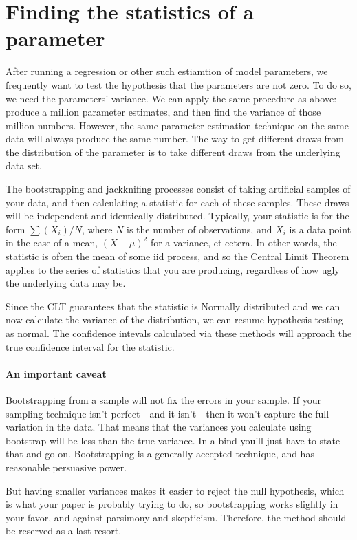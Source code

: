 \section{Finding the statistics of a parameter}
After running a regression or other such estiamtion of model parameters,
we frequently want to test the hypothesis that the parameters are not
zero. To do so, we need the parameters' variance.
We can apply the same procedure as above: produce a million parameter
estimates, and then find the variance of those million numbers. However,
the same parameter estimation technique on the same data will always
produce the same number. The way to get different draws from the
distribution of the parameter is to take different draws from the
underlying data set.

The bootstrapping and jackknifing processes consist of taking artificial
samples of your data, and then calculating a statistic for each of these
samples. These draws will be independent and identically distributed.
Typically, your statistic is for the form $\sum (X_i)/ N$, where  $N$
is the number of observations, and $X_i$ is a data point in the case
of a mean, $(X-\mu)^2$ for a variance, et cetera. In other words, the
statistic is often the mean of some iid process, and so the Central
Limit Theorem applies to the series of statistics that you are
producing, regardless of how ugly the underlying data may be.

Since the CLT guarantees that the  statistic is Normally distributed
and we can now calculate the variance of the distribution, we can resume
hypothesis testing as normal. The confidence intevals calculated via these
methods will approach the true confidence interval for the statistic.

\paragraph{An important caveat} Bootstrapping from a sample will not fix
the errors in your sample. If your sampling technique isn't perfect---and
it isn't---then it won't capture the full variation in the data. That
means that the variances you calculate using bootstrap will be less than
the true variance. In a bind you'll just have
to state that and go on. Bootstrapping is a generally accepted technique,
and has reasonable persuasive power.

But having smaller variances makes
it easier to reject the null hypothesis, which is what your paper is
probably trying to do, so bootstrapping works slightly in your favor,
and against parsimony and skepticism. Therefore, the method should be
reserved as a last resort.


